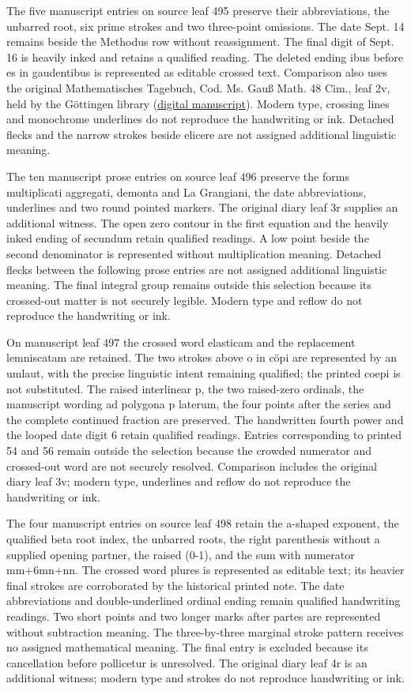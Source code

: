 The five manuscript entries on source leaf 495 preserve their abbreviations, the unbarred root, six prime strokes and two three-point omissions. The date Sept. 14 remains beside the Methodus row without reassignment. The final digit of Sept. 16 is heavily inked and retains a qualified reading. The deleted ending ibus before es in gaudentibus is represented as editable crossed text. Comparison also uses the original Mathematisches Tagebuch, Cod. Ms. Gauß Math. 48 Cim., leaf 2v, held by the Göttingen library (\href{https://gdz.sub.uni-goettingen.de/id/DE-611-HS-3382323}{digital manuscript}). Modern type, crossing lines and monochrome underlines do not reproduce the handwriting or ink. Detached flecks and the narrow strokes beside elicere are not assigned additional linguistic meaning.

The ten manuscript prose entries on source leaf 496 preserve the forms multiplicati aggregati, demonta and La Grangiani, the date abbreviations, underlines and two round pointed markers. The original diary leaf 3r supplies an additional witness. The open zero contour in the first equation and the heavily inked ending of secundum retain qualified readings. A low point beside the second denominator is represented without multiplication meaning. Detached flecks between the following prose entries are not assigned additional linguistic meaning. The final integral group remains outside this selection because its crossed-out matter is not securely legible. Modern type and reflow do not reproduce the handwriting or ink.

On manuscript leaf 497 the crossed word elasticam and the replacement lemniscatam are retained. The two strokes above o in cöpi are represented by an umlaut, with the precise linguistic intent remaining qualified; the printed coepi is not substituted. The raised interlinear p, the two raised-zero ordinals, the manuscript wording ad polygona p laterum, the four points after the series and the complete continued fraction are preserved. The handwritten fourth power and the looped date digit 6 retain qualified readings. Entries corresponding to printed 54 and 56 remain outside the selection because the crowded numerator and crossed-out word are not securely resolved. Comparison includes the original diary leaf 3v; modern type, underlines and reflow do not reproduce the handwriting or ink.

The four manuscript entries on source leaf 498 retain the a-shaped exponent, the qualified beta root index, the unbarred roots, the right parenthesis without a supplied opening partner, the raised (0-1), and the sum with numerator mm+6mn+nn. The crossed word plures is represented as editable text; its heavier final strokes are corroborated by the historical printed note. The date abbreviations and double-underlined ordinal ending remain qualified handwriting readings. Two short points and two longer marks after partes are represented without subtraction meaning. The three-by-three marginal stroke pattern receives no assigned mathematical meaning. The final entry is excluded because its cancellation before pollicetur is unresolved. The original diary leaf 4r is an additional witness; modern type and strokes do not reproduce handwriting or ink.

